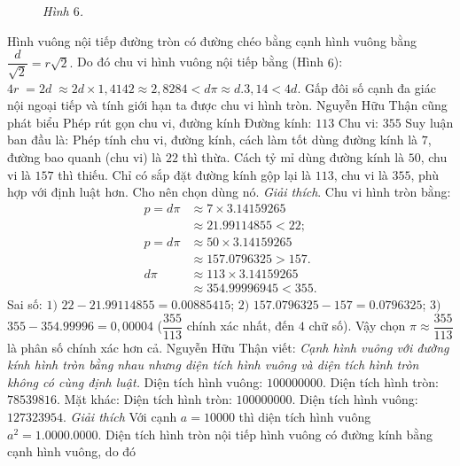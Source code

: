 \begin{multicols}{2}
\begin{figure}[H]
		\caption{\small\textit{\color{lichsutoanhoc}Hình $6$.}}
		\vspace*{-10pt}
	\end{figure}
	Hình vuông nội tiếp đường tròn có đường chéo bằng cạnh hình vuông bằng $\dfrac{d}{{\sqrt 2 }} = r\sqrt 2 .$ Do đó  chu vi hình vuông nội tiếp bằng (Hình $6$): $4r\; = 2d\; \approx 2d \times 1,4142 \approx 2,8284 < d\pi  \approx d.3,14 < 4d$.
	Gấp đôi số cạnh đa giác nội ngoại tiếp và tính giới hạn ta được chu vi hình tròn.
	Nguyễn Hữu Thận cũng phát biểu
	\vskip 0.1cm
	Phép rút gọn chu vi, đường kính
	\vskip 0.1cm 
	Đường kính: $113$	Chu vi: $355$
	\vskip 0.1cm
	Suy luận ban đầu là: Phép tính chu vi, đường kính, cách làm tốt dùng đường kính là $7$, đường bao quanh (chu vi) là $22$ thì thừa. Cách tỷ mỉ dùng đường kính là $50$, chu vi là $157$ thì thiếu. Chỉ có sắp đặt đường kính gộp lại là $113$, chu vi là $355$, phù hợp với định luật hơn. Cho nên chọn dùng nó.
	\vskip 0.1cm 
	\textit{Giải thích}. Chu vi hình tròn bằng:
	\begin{align*}
		p = d\pi  &\approx 7 \times 3.14159265 \\
		&\approx 21.99114855 < 22;\\
		p = d\pi  &\approx 50 \times 3.14159265 \\
		&\approx 157.0796325 > 157.\\
		d\pi  &\approx 113 \times 3.14159265 \\
		&\approx 354.99996945 < 355.
	\end{align*}
	Sai số:
	\vskip 0.1cm 		
	$1)$ $22 - 21.99114855 = 0.00885415$;  
	\vskip 0.1cm
	$2)$ $157.0796325 - 157 = 0.0796325$;
	\vskip 0.1cm
	$3)$ $355 - 354.99996 = 0,00004$
	($\dfrac{{355}}{{113}}$ chính xác nhất, đến $4$ chữ số).
	\vskip 0.1cm
	Vậy chọn $\pi  \approx \dfrac{{355}}{{113}}$ là phân số chính xác hơn cả. 
	\vskip 0.1cm
	Nguyễn Hữu Thận viết: \textit{Cạnh hình vuông với đường kính hình tròn bằng nhau nhưng diện tích hình vuông và diện tích hình tròn không có cùng định luật.}
	\vskip 0.1cm
	Diện tích hình vuông: $100000000$.
	\vskip 0.1cm	
	Diện tích hình tròn: $78539816$.
	\vskip 0.1cm
	Mặt khác:
	\vskip 0.1cm
	Diện tích hình tròn: $100000000$.
	\vskip 0.1cm 	
	Diện tích hình vuông: $127323954$.
	\vskip 0.1cm
	\textit{Giải thích} Với cạnh $a = 10000$ thì diện tích hình vuông ${a^2} = 1.0000.0000$. Diện tích hình tròn nội tiếp hình vuông có đường kính bằng cạnh hình vuông, do đó 
	\setlength{\abovedisplayskip}{7pt}

\end{multicols}
